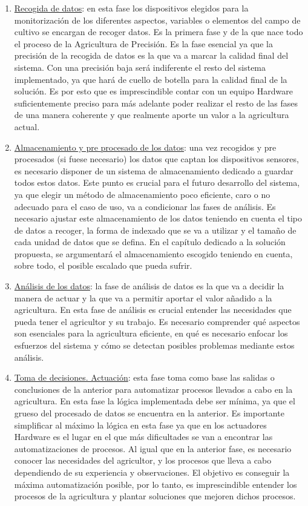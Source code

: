 \documentclass[../../memoria.tex]{subfiles}
\begin{document}
\begin{enumerate}
  \item \uline{Recogida de datos}: en esta fase los dispositivos elegidos para la monitorización de los diferentes aspectos, variables o elementos del campo de cultivo se encargan de recoger datos. Es la primera fase y de la que nace todo el proceso de la Agricultura de Precisión. Es la fase esencial ya que la precisión de la recogida de datos es la que va a marcar la calidad final del sistema. Con una precisión baja será indiferente el resto del sistema implementado, ya que hará de cuello de botella para la calidad final de la solución. Es por esto que es imprescindible contar con un equipo Hardware suficientemente preciso para más adelante poder realizar el resto de las fases de una manera coherente y que realmente aporte un valor a la agricultura actual.

  \item \uline{Almacenamiento y pre procesado de los datos}: una vez recogidos y pre procesados (si fuese necesario) los datos que captan los dispositivos sensores, es necesario disponer de un sistema de almacenamiento dedicado a guardar todos estos datos. Este punto es crucial para el futuro desarrollo del sistema, ya que elegir un método de almacenamiento poco eficiente, caro o no adecuado para el caso de uso, va a condicionar las fases de análisis. Es necesario ajustar este almacenamiento de los datos teniendo en cuenta el tipo de datos a recoger, la forma de indexado que se va a utilizar y el tamaño de cada unidad de datos que se defina. En el capítulo dedicado a la solución propuesta, se argumentará el almacenamiento escogido teniendo en cuenta, sobre todo, el posible escalado que pueda sufrir.

  \item  \uline{Análisis de los datos}: la fase de análisis de datos es la que va a decidir la manera de actuar y la que va a permitir aportar el valor añadido a la agricultura. En esta fase de análisis es crucial entender las necesidades que pueda tener el agricultor y su trabajo. Es necesario comprender qué aspectos son esenciales para la agricultura eficiente, en qué es necesario enfocar los esfuerzos del sistema y cómo se detectan posibles problemas mediante estos análisis.

  \item  \uline{Toma de decisiones. Actuación}: esta fase toma como base las salidas o conclusiones de la anterior para automatizar procesos llevados a cabo en la agricultura. En esta fase la lógica implementada debe ser mínima, ya que el grueso del procesado de datos se encuentra en la anterior. Es importante simplificar al máximo la lógica en esta fase ya que en los actuadores Hardware es el lugar en el que más dificultades se van a encontrar las automatizaciones de procesos. Al igual que en la anterior fase, es necesario conocer las necesidades del agricultor, y los procesos que lleva a cabo dependiendo de su experiencia y observaciones. El objetivo es conseguir la máxima automatización posible, por lo tanto, es imprescindible entender los procesos de la agricultura y plantar soluciones que mejoren dichos procesos.


\end{enumerate}
\end{document}
